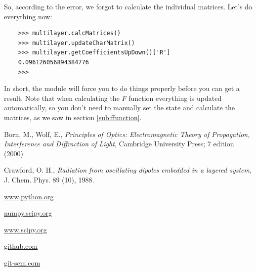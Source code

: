 \documentclass[a4paper,11pt,aps,final]{revtex4}
\begin{document}
So, according to the error, we forgot to calculate the individual matrices. Let's do everything now:

\begin{verbatim}
    >>> multilayer.calcMatrices()
    >>> multilayer.updateCharMatrix()
    >>> multilayer.getCoefficientsUpDown()['R']
    0.096126056894384776
    >>>
\end{verbatim}

In short, the module will force you to do things properly before you can get a result. Note that when calculating the $F$ function everything is updated automatically, so you don't need to manually set the state and calculate the matrices, as we saw in section \ref{sub:ffunction}.

\begin{thebibliography}{9}

 Born, M., Wolf, E., \textit{Principles of Optics: Electromagnetic Theory of Propagation, Interference and Diffraction of Light}, Cambridge University Press; 7 edition (2000)

 Crawford, O. H., \textit{Radiation from oscillating dipoles embedded in a layered system}, J. Chem. Phys. 89 (10), 1988.

 \url{www.python.org}

 \url{numpy.scipy.org}

 \url{www.scipy.org}

 \url{github.com}

 \url{git-scm.com}

\end{thebibliography}
\end{document}
